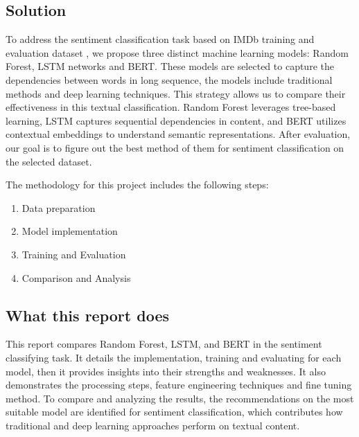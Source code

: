 \subsection{Solution}
To address the sentiment classification task based on IMDb training and evaluation dataset \cite{stanfordnlp2025imdb}, we propose three distinct machine learning models: Random Forest, LSTM networks and BERT. These models are selected to capture the dependencies between words in long sequence, the models include traditional methods and deep learning techniques. This strategy allows us to compare their effectiveness in this textual classification. Random Forest leverages tree-based learning, LSTM captures sequential dependencies in content, and BERT utilizes contextual embeddings to understand semantic representations. After evaluation, our goal is to figure out the best method of them for sentiment classification on the selected dataset.

The methodology for this project includes the following steps:
\begin{enumerate}
    \item Data preparation
    \item Model implementation
    \item Training and Evaluation
    \item Comparison and Analysis
\end{enumerate}


\subsection{What this report does}
This report compares Random Forest, LSTM, and BERT in the sentiment classifying task. It details the implementation, training and evaluating for each model, then it provides insights into their strengths and weaknesses. It also demonstrates the processing steps, feature engineering techniques and fine tuning method. To compare and analyzing the results, the recommendations on the most suitable model are identified for sentiment classification, which contributes how traditional and deep learning approaches perform on textual content.